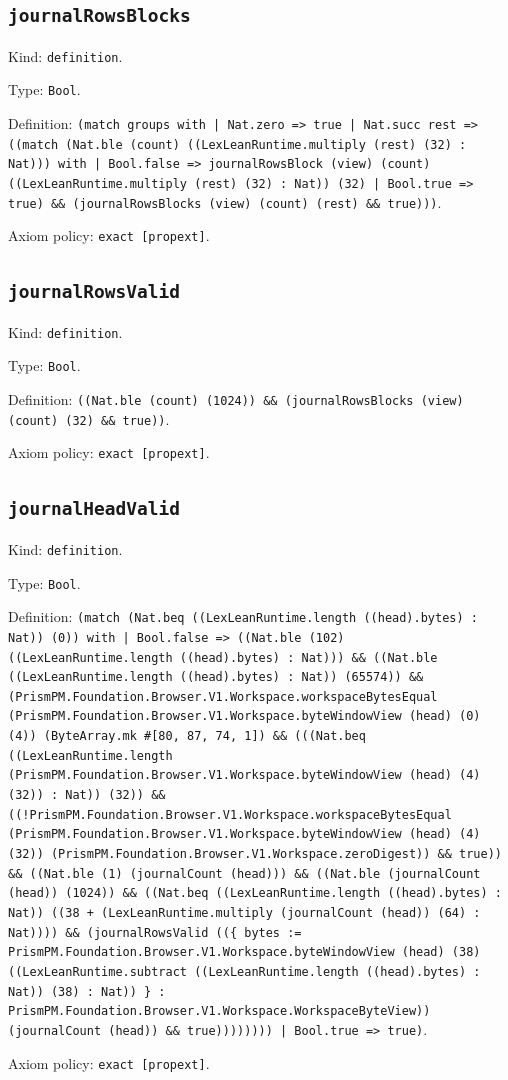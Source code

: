 \documentclass[11pt]{article}
\begin{document}
\subsection*{\texttt{journalRowsBlocks}}
\noindent Kind: \texttt{definition}.\par
\noindent Type: \texttt{Bool}.\par
\noindent Definition: \texttt{(match groups with | Nat.zero => true | Nat.succ rest => ((match (Nat.ble (count) ((LexLeanRuntime.multiply (rest) (32) : Nat))) with | Bool.false => journalRowsBlock (view) (count) ((LexLeanRuntime.multiply (rest) (32) : Nat)) (32) | Bool.true => true) \&\& (journalRowsBlocks (view) (count) (rest) \&\& true)))}.\par
\noindent Axiom policy: \texttt{exact [propext]}.\par
\subsection*{\texttt{journalRowsValid}}
\noindent Kind: \texttt{definition}.\par
\noindent Type: \texttt{Bool}.\par
\noindent Definition: \texttt{((Nat.ble (count) (1024)) \&\& (journalRowsBlocks (view) (count) (32) \&\& true))}.\par
\noindent Axiom policy: \texttt{exact [propext]}.\par
\subsection*{\texttt{journalHeadValid}}
\noindent Kind: \texttt{definition}.\par
\noindent Type: \texttt{Bool}.\par
\noindent Definition: \texttt{(match (Nat.beq ((LexLeanRuntime.length ((head).bytes) : Nat)) (0)) with | Bool.false => ((Nat.ble (102) ((LexLeanRuntime.length ((head).bytes) : Nat))) \&\& ((Nat.ble ((LexLeanRuntime.length ((head).bytes) : Nat)) (65574)) \&\& (PrismPM.Foundation.Browser.V1.Workspace.workspaceBytesEqual (PrismPM.Foundation.Browser.V1.Workspace.byteWindowView (head) (0) (4)) (ByteArray.mk \#[80, 87, 74, 1]) \&\& (((Nat.beq ((LexLeanRuntime.length (PrismPM.Foundation.Browser.V1.Workspace.byteWindowView (head) (4) (32)) : Nat)) (32)) \&\& ((!PrismPM.Foundation.Browser.V1.Workspace.workspaceBytesEqual (PrismPM.Foundation.Browser.V1.Workspace.byteWindowView (head) (4) (32)) (PrismPM.Foundation.Browser.V1.Workspace.zeroDigest)) \&\& true)) \&\& ((Nat.ble (1) (journalCount (head))) \&\& ((Nat.ble (journalCount (head)) (1024)) \&\& ((Nat.beq ((LexLeanRuntime.length ((head).bytes) : Nat)) ((38 + (LexLeanRuntime.multiply (journalCount (head)) (64) : Nat)))) \&\& (journalRowsValid ((\{ bytes := PrismPM.Foundation.Browser.V1.Workspace.byteWindowView (head) (38) ((LexLeanRuntime.subtract ((LexLeanRuntime.length ((head).bytes) : Nat)) (38) : Nat)) \} : PrismPM.Foundation.Browser.V1.Workspace.WorkspaceByteView)) (journalCount (head)) \&\& true)))))))) | Bool.true => true)}.\par
\noindent Axiom policy: \texttt{exact [propext]}.\par
\end{document}
